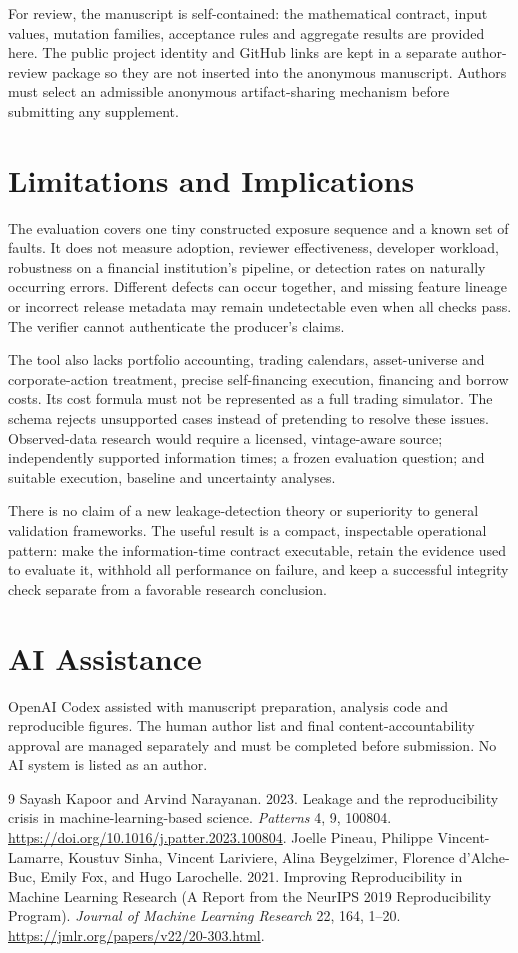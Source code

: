 \documentclass[sigconf,anonymous,nonacm]{acmart}
\begin{document}
For review, the manuscript is self-contained: the mathematical contract, input values, mutation families, acceptance rules and aggregate results are provided here. The public project identity and GitHub links are kept in a separate author-review package so they are not inserted into the anonymous manuscript. Authors must select an admissible anonymous artifact-sharing mechanism before submitting any supplement.

\section{Limitations and Implications}
The evaluation covers one tiny constructed exposure sequence and a known set of faults. It does not measure adoption, reviewer effectiveness, developer workload, robustness on a financial institution's pipeline, or detection rates on naturally occurring errors. Different defects can occur together, and missing feature lineage or incorrect release metadata may remain undetectable even when all checks pass. The verifier cannot authenticate the producer's claims.

The tool also lacks portfolio accounting, trading calendars, asset-universe and corporate-action treatment, precise self-financing execution, financing and borrow costs. Its cost formula must not be represented as a full trading simulator. The schema rejects unsupported cases instead of pretending to resolve these issues. Observed-data research would require a licensed, vintage-aware source; independently supported information times; a frozen evaluation question; and suitable execution, baseline and uncertainty analyses.

There is no claim of a new leakage-detection theory or superiority to general validation frameworks. The useful result is a compact, inspectable operational pattern: make the information-time contract executable, retain the evidence used to evaluate it, withhold all performance on failure, and keep a successful integrity check separate from a favorable research conclusion.

\section*{AI Assistance}
OpenAI Codex assisted with manuscript preparation, analysis code and reproducible figures. The human author list and final content-accountability approval are managed separately and must be completed before submission. No AI system is listed as an author.

\begin{thebibliography}{9}
 Sayash Kapoor and Arvind Narayanan. 2023. Leakage and the reproducibility crisis in machine-learning-based science. \emph{Patterns} 4, 9, 100804. \url{https://doi.org/10.1016/j.patter.2023.100804}.
 Joelle Pineau, Philippe Vincent-Lamarre, Koustuv Sinha, Vincent Lariviere, Alina Beygelzimer, Florence d'Alche-Buc, Emily Fox, and Hugo Larochelle. 2021. Improving Reproducibility in Machine Learning Research (A Report from the NeurIPS 2019 Reproducibility Program). \emph{Journal of Machine Learning Research} 22, 164, 1--20. \url{https://jmlr.org/papers/v22/20-303.html}.
\end{thebibliography}
\end{document}
